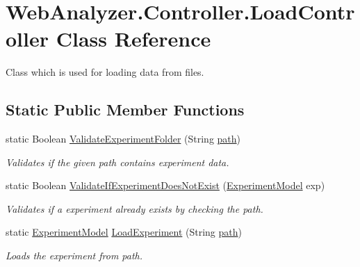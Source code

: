 \hypertarget{class_web_analyzer_1_1_controller_1_1_load_controller}{}\section{Web\+Analyzer.\+Controller.\+Load\+Controller Class Reference}
\label{class_web_analyzer_1_1_controller_1_1_load_controller}


Class which is used for loading data from files.  


\subsection*{Static Public Member Functions}
\begin{DoxyCompactItemize}
\item 
static Boolean \hyperlink{class_web_analyzer_1_1_controller_1_1_load_controller_a4ccfcc1eddcf758a1d9c3df334750a05}{Validate\+Experiment\+Folder} (String \hyperlink{_u_i_2_h_t_m_l_resources_2js_2src_2create__experiment_8js_aa72e0c8a20e6bcc571d3a1c51846e627}{path})
\begin{DoxyCompactList}\small\item\em Validates if the given path contains experiment data. \end{DoxyCompactList}\item 
static Boolean \hyperlink{class_web_analyzer_1_1_controller_1_1_load_controller_a2cf58e1b4a77099dc5fa14f4743fcb16}{Validate\+If\+Experiment\+Does\+Not\+Exist} (\hyperlink{class_web_analyzer_1_1_models_1_1_base_1_1_experiment_model}{Experiment\+Model} exp)
\begin{DoxyCompactList}\small\item\em Validates if a experiment already exists by checking the path. \end{DoxyCompactList}\item 
static \hyperlink{class_web_analyzer_1_1_models_1_1_base_1_1_experiment_model}{Experiment\+Model} \hyperlink{class_web_analyzer_1_1_controller_1_1_load_controller_a49122060869d7d678c3f0518f70bbe04}{Load\+Experiment} (String \hyperlink{_u_i_2_h_t_m_l_resources_2js_2src_2create__experiment_8js_aa72e0c8a20e6bcc571d3a1c51846e627}{path})
\begin{DoxyCompactList}\small\item\em Loads the experiment from path. \end{DoxyCompactList}\item 

\end{DoxyCompactItemize}
